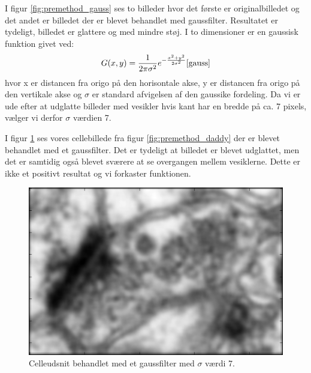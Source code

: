I figur \ref{fig:premethod_gauss} ses to billeder hvor det første er originalbilledet og det andet er billedet der er blevet behandlet med gaussfilter. Resultatet er tydeligt, billedet er glattere og med mindre støj. I to dimensioner er en gaussisk funktion givet ved: 
\begin{align}
	G(x,y) = \frac{1}{2\pi\sigma^2}e^{-\frac{x^2+y^2}{2\sigma^2}}\label{ali:premethod_gaussG}\cite{gauss}
\end{align}
hvor x er distancen fra origo på den horisontale akse, y er distancen fra origo på den vertikale akse og $\sigma$ er standard afvigelsen af den gaussike fordeling. 
Da vi er ude efter at udglatte billeder med vesikler hvis kant har en bredde på ca. 7 pixels, vælger vi derfor $\sigma$ værdien 7.

I figur \ref{fig:premethod_GaussCelle} ses vores cellebillede fra figur \ref{fig:premethod_daddy} der er blevet behandlet med et gaussfilter. Det er tydeligt at billedet er blevet udglattet, men det er samtidig også blevet sværere at se overgangen mellem vesiklerne. Dette er ikke et positivt resultat og vi forkaster funktionen.

\begin{figure}[H]
	\centering
	\includegraphics[scale=0.8]{files/premethod/img/gausscell.png}
	\caption{Celleudsnit behandlet med et gaussfilter med $\sigma$ værdi 7.\label{fig:premethod_GaussCelle}}
\end{figure}

